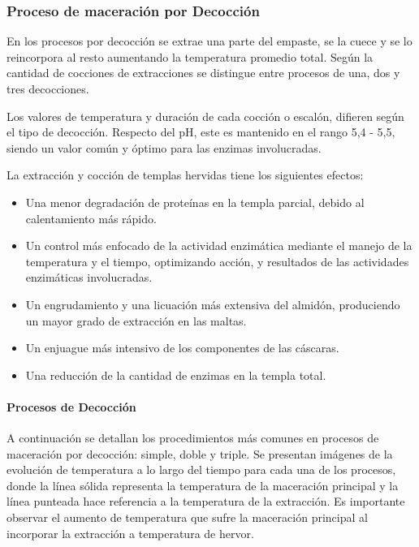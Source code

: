             \subsubsection{Proceso de maceración por Decocción}
                \par En los procesos por decocción se extrae una parte del empaste, se la cuece y se lo reincorpora al resto aumentando la temperatura promedio total. Según la cantidad de cocciones de extracciones se distingue entre procesos de una, dos y tres decocciones.
            
                \par Los valores de temperatura y duración de cada cocción o escalón, difieren según el tipo de decocción. Respecto del pH, este es mantenido en el rango 5,4 - 5,5, siendo un valor común y óptimo para las enzimas involucradas.
                
                \par La extracción y cocción de templas hervidas tiene los siguientes efectos:
                
                \begin{itemize}
                    \item Una menor degradación de proteínas en la templa parcial, debido al calentamiento más rápido.
                    
                    \item Un control más enfocado de la actividad enzimática mediante el manejo de la temperatura y el tiempo, optimizando acción, y resultados de las actividades enzimáticas involucradas.
                    
                    \item Un engrudamiento y una licuación más extensiva del almidón, produciendo un mayor grado de extracción en las maltas.
                    
                    \item Un enjuague más intensivo de los componentes de las cáscaras.
                    
                    \item Una reducción de la cantidad de enzimas en la templa total.
                \end{itemize}
                
                \paragraph{Procesos de Decocción} A continuación se detallan los procedimientos más comunes en procesos de maceración por decocción: simple, doble y triple. Se presentan imágenes de la evolución de temperatura a lo largo del tiempo para cada una de los procesos, donde la línea sólida representa la temperatura de la maceración principal y la línea punteada hace referencia a la temperatura de la extracción. Es importante observar el aumento de temperatura que sufre la maceración principal al incorporar la extracción a temperatura de hervor.
                
